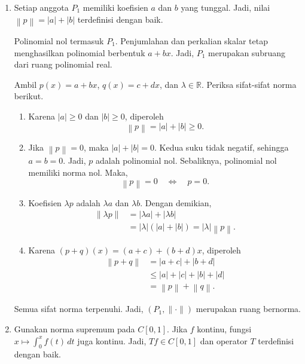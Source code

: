 \documentclass[11pt,a4paper]{article}
\newcommand{\R}{\mathbb{R}}
\newcommand{\norm}[1]{\left\lVert #1\right\rVert}
\begin{document}
\begin{enumerate}[itemsep=12pt,parsep=5pt]
  \item Setiap anggota $P_1$ memiliki koefisien $a$ dan $b$ yang tunggal.
        Jadi, nilai $\norm{p}=|a|+|b|$ terdefinisi dengan baik.

        Polinomial nol termasuk $P_1$.
        Penjumlahan dan perkalian skalar tetap menghasilkan polinomial berbentuk $a+bx$.
        Jadi, $P_1$ merupakan subruang dari ruang polinomial real.

        Ambil $p(x)=a+bx$, $q(x)=c+dx$, dan $\lambda\in\R$.
        Periksa sifat-sifat norma berikut.
        \begin{enumerate}
          \item Karena $|a|\ge0$ dan $|b|\ge0$, diperoleh
                \[
                  \norm{p}=|a|+|b|\ge0.
                \]

          \item Jika $\norm{p}=0$, maka $|a|+|b|=0$.
                Kedua suku tidak negatif, sehingga $a=b=0$.
                Jadi, $p$ adalah polinomial nol.
                Sebaliknya, polinomial nol memiliki norma nol.
                Maka,
                \[
                  \norm{p}=0\quad\Longleftrightarrow\quad p=0.
                \]

          \item Koefisien $\lambda p$ adalah $\lambda a$ dan $\lambda b$.
                Dengan demikian,
                \begin{align*}
                  \norm{\lambda p}
                   & =|\lambda a|+|\lambda b| \\
                   & =|\lambda|(|a|+|b|)
                  =|\lambda|\norm{p}.
                \end{align*}

          \item Karena $(p+q)(x)=(a+c)+(b+d)x$, diperoleh
                \begin{align*}
                  \norm{p+q}
                   & =|a+c|+|b+d|        \\
                   & \le |a|+|c|+|b|+|d| \\
                   & =\norm{p}+\norm{q}.
                \end{align*}
        \end{enumerate}
        Semua sifat norma terpenuhi.
        Jadi, $(P_1,\lVert\cdot\rVert)$ merupakan ruang bernorma.

  \item Gunakan norma supremum pada $C[0,1]$.
        Jika $f$ kontinu, fungsi $x\mapsto\int_0^x f(t)\,dt$ juga kontinu.
        Jadi, $Tf\in C[0,1]$ dan operator $T$ terdefinisi dengan baik.


\end{enumerate}
\end{document}
